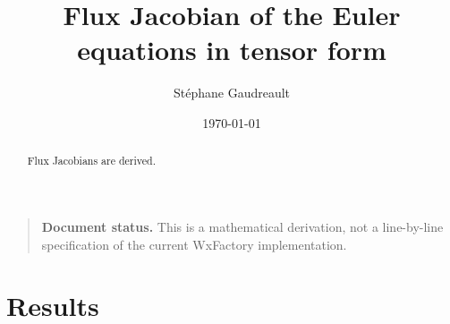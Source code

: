 \documentclass[12pt]{article}
\title{Flux Jacobian of the Euler equations in tensor form}
\author{Stéphane Gaudreault}
\date{\today}
\begin{document}
\maketitle

\begin{quote}
\textbf{Document status.} This is a mathematical derivation, not a line-by-line specification of
the current WxFactory implementation.
\end{quote}

\begin{abstract}
Flux Jacobians are derived.
\end{abstract}

\section{Results}
\end{document}

